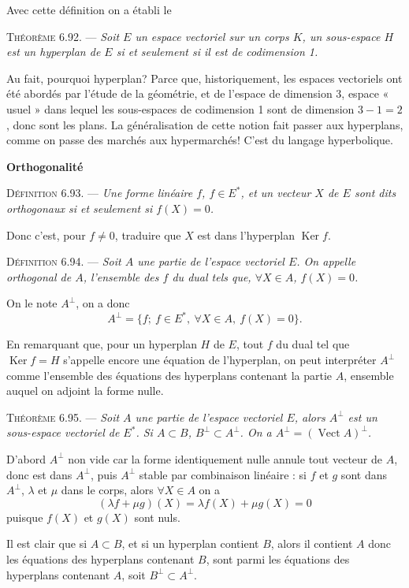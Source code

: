Avec cette définition on a établi le

\medskip\noindent\textsc{Théorème 6.92.} --- \emph{Soit $E$ un espace vectoriel sur un corps $K$, un sous-espace $H$ est un hyperplan de $E$ si et seulement si il est de codimension 1.} \bookend

Au fait, pourquoi hyperplan? Parce que, historiquement, les espaces vectoriels ont été abordés par l'étude de la géométrie, et de l'espace de dimension 3, espace « usuel » dans lequel les sous-espaces de codimension 1 sont de dimension $3-1=2$, donc sont les plans. La généralisation de cette notion fait passer aux hyperplans, comme on passe des marchés aux hypermarchés! C'est du langage hyperbolique.

\medskip\noindent\textbf{Orthogonalité}

\medskip\noindent\textsc{Définition 6.93.} --- \emph{Une forme linéaire $f$, $f\in E^*$, et un vecteur $X$ de $E$ sont dits orthogonaux si et seulement si $f(X)=0$.}

Donc c'est, pour $f\ne0$, traduire que $X$ est dans l'hyperplan $\operatorname{Ker} f$.

\medskip\noindent\textsc{Définition 6.94.} --- \emph{Soit $A$ une partie de l'espace vectoriel $E$. On appelle orthogonal de $A$, l'ensemble des $f$ du dual tels que, $\forall X\in A$, $f(X)=0$.}

On le note $A^\perp$, on a donc
\[
A^\perp=\{f;\ f\in E^*,\ \forall X\in A,\ f(X)=0\}.
\]

En remarquant que, pour un hyperplan $H$ de $E$, tout $f$ du dual tel que $\operatorname{Ker} f=H$ s'appelle encore une équation de l'hyperplan, on peut interpréter $A^\perp$ comme l'ensemble des équations des hyperplans contenant la partie $A$, ensemble auquel on adjoint la forme nulle.

\medskip\noindent\textsc{Théorème 6.95.} --- \emph{Soit $A$ une partie de l'espace vectoriel $E$, alors $A^\perp$ est un sous-espace vectoriel de $E^*$. Si $A\subset B$, $B^\perp\subset A^\perp$. On a $A^\perp=(\operatorname{Vect}A)^\perp$.}

D'abord $A^\perp$ non vide car la forme identiquement nulle annule tout vecteur de $A$, donc est dans $A^\perp$, puis $A^\perp$ stable par combinaison linéaire : si $f$ et $g$ sont dans $A^\perp$, $\lambda$ et $\mu$ dans le corps, alors $\forall X\in A$ on a
\[
(\lambda f+\mu g)(X)=\lambda f(X)+\mu g(X)=0
\]
puisque $f(X)$ et $g(X)$ sont nuls.

Il est clair que si $A\subset B$, et si un hyperplan contient $B$, alors il contient $A$ donc les équations des hyperplans contenant $B$, sont parmi les équations des hyperplans contenant $A$, soit $B^\perp\subset A^\perp$.

